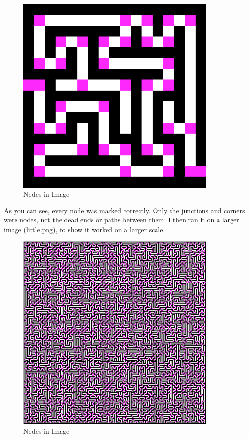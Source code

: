 \documentclass[titlepage]{article}
\begin{document}
\begin{figure}[H]
  \centering
  \includegraphics[width=10cm]{NodesDisplaysmallone.png}
  \caption{Nodes in Image}
  \label{fig:dijk}
\end{figure}

As you can see, every node was marked correctly. Only the junctions and corners were nodes, not the dead ends or paths between them. I then ran it on a larger image (little.png), to show it worked on a larger scale.

\begin{figure}[H]
  \centering
  \includegraphics[width=10cm]{NodesDisplaylitle.png}
  \caption{Nodes in Image}
  \label{fig:dijk}
\end{figure}
\end{document}
